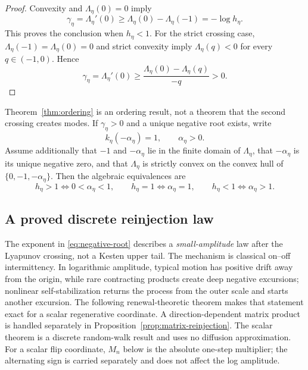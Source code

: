 \documentclass[11pt]{article}
\theoremstyle{definition}
\begin{document}
\begin{proof}
Convexity and $\Lambda_\eta(0)=0$ imply
\[
  \gamma_\eta=\Lambda_\eta'(0)
  \geq\Lambda_\eta(0)-\Lambda_\eta(-1)
  =-\log h_\eta.
\]
This proves the conclusion when $h_\eta<1$.
For the strict crossing case, $\Lambda_\eta(-1)=\Lambda_\eta(0)=0$ and
strict convexity imply $\Lambda_\eta(q)<0$ for every $q\in(-1,0)$.  Hence
\[
 \gamma_\eta=\Lambda_\eta'(0)
 \geq\frac{\Lambda_\eta(0)-\Lambda_\eta(q)}{-q}>0.
\]
\end{proof}

Theorem~\ref{thm:ordering} is an ordering result, not a theorem that the
second crossing creates modes.  If $\gamma_\eta>0$ and a unique negative root
exists, write
\begin{equation}
  k_\eta(-\alpha_\eta)=1,
  \qquad \alpha_\eta>0.
  \label{eq:negative-root}
\end{equation}
Assume additionally that $-1$ and $-\alpha_\eta$ lie in the finite domain of
$\Lambda_\eta$, that $-\alpha_\eta$ is its unique negative zero, and that
$\Lambda_\eta$ is strictly convex on the convex hull of
$\{0,-1,-\alpha_\eta\}$.  Then the algebraic equivalences are
\begin{equation}
  h_\eta>1\Longleftrightarrow0<\alpha_\eta<1,
  \qquad
  h_\eta=1\Longleftrightarrow\alpha_\eta=1,
  \qquad
  h_\eta<1\Longleftrightarrow\alpha_\eta>1.
  \label{eq:root-order}
\end{equation}

\subsection{A proved discrete reinjection law}
\label{sec:reinjection-theorem}

The exponent in \eqref{eq:negative-root} describes a \emph{small-amplitude}
law after the Lyapunov crossing, not a Kesten upper tail.  The mechanism is
classical on--off intermittency.  In logarithmic amplitude, typical motion
has positive drift away from the origin, while rare contracting products
create deep negative excursions; nonlinear self-stabilization returns the
process from the outer scale and starts another excursion.  The following
renewal-theoretic theorem makes that statement exact for a scalar
regenerative coordinate.  A direction-dependent matrix product is handled
separately in Proposition~\ref{prop:matrix-reinjection}.  The scalar theorem
is a discrete random-walk result and uses no diffusion approximation.
For a scalar flip coordinate, $M_n$ below is the absolute one-step
multiplier; the alternating sign is carried separately and does not affect
the log amplitude.
\end{document}
